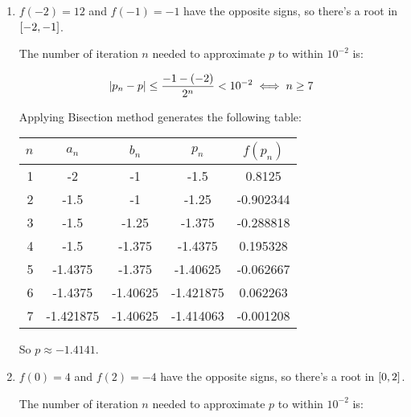 \documentclass[../../Assignments.tex]{subfiles}
\begin{document}
\begin{solution}
    \begin{enumerate}[label = (\alph*)]
        \item \(f(-2) = 12\) and \(f(-1) = -1\) have the opposite signs, so
            there's a root in \(\interval{-2}{-1}\).

            The number of iteration \(n\) needed to approximate \(p\) to within
            \(10^{-2}\) is:

            \[\abs{p_n - p} \leq \frac{-1 - (-2)}{2^n} < 10^{-2} \iff n \geq 7\]

            Applying Bisection method generates the following table:

            \begin{table}[H]
                \centering
                \begin{tabular}{r S[table-format=-1.6] S[table-format=-1.5] S[table-format=-1.6] S[table-format=-1.6]}
                    \toprule
                    \(n\)  &  {\(a_n\)}  &  {\(b_n\)}  &  {\(p_n\)}  &  {\(f(p_n)\)}  \\
                      &  -2         &  -1         &  -1.5       &   0.8125       \\
                        2  &  -1.5       &  -1         &  -1.25      &  -0.902344     \\
                        3  &  -1.5       &  -1.25      &  -1.375     &  -0.288818     \\
                        4  &  -1.5       &  -1.375     &  -1.4375    &   0.195328     \\
                        5  &  -1.4375    &  -1.375     &  -1.40625   &  -0.062667     \\
                        6  &  -1.4375    &  -1.40625   &  -1.421875  &   0.062263     \\
                        7  &  -1.421875  &  -1.40625   &  -1.414063  &  -0.001208     \\
                    \bottomrule
                \end{tabular}
            \end{table}

            So \(p \approx \num{-1.4141}\).

        \item \(f(0) = 4\) and \(f(2) = -4\) have the opposite signs, so there's
            a root in \(\interval{0}{2}\).

            The number of iteration \(n\) needed to approximate \(p\) to within
            \(10^{-2}\) is:


\end{enumerate}
\end{solution}
\end{document}
